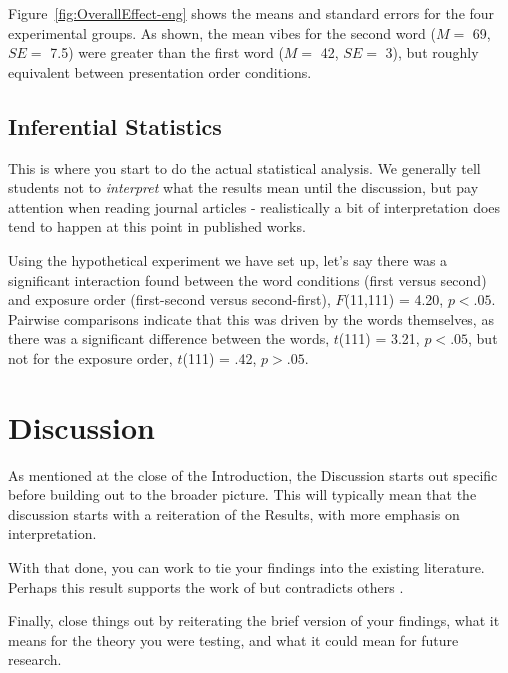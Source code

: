 \documentclass[stu,12pt,floatsintext,a4paper]{apa7}
\begin{document}
Figure~\ref{fig:OverallEffect-eng} shows the means and standard errors for the four experimental groups. As shown, the mean vibes for the second word ($M = $ 69, $SE = $ 7.5) were greater than the first word ($M = $ 42, $SE = $ 3), but roughly equivalent between presentation order conditions.

\subsection{Inferential Statistics}

This is where you start to do the actual statistical analysis. We generally tell students not to \textit{interpret} what the results mean until the discussion, but pay attention when reading journal articles - realistically a bit of interpretation does tend to happen at this point in published works.

\newcommand{\ttestSig}[2]{$t$(#1) = #2, $p < .05$}
\newcommand{\ttestInsig}[2]{$t$(#1) = #2, $p > .05$}
\newcommand{\anovaSig}[3]{$F$(#1,#2) = #3, $p < .05$}
\newcommand{\anovaInsig}[3]{$F$(#1,#2) = #3, $p > .05$}

Using the hypothetical experiment we have set up, let's say there was a significant interaction found between the word conditions (first versus second) and exposure order (first-second versus second-first), \anovaSig{11}{111}{4.20}. Pairwise comparisons indicate that this was driven by the words themselves, as there was a significant difference between the words, \ttestSig{111}{3.21}, but not for the exposure order, \ttestInsig{111}{.42}.

\section{Discussion}

As mentioned at the close of the Introduction, the Discussion starts out specific before building out to the broader picture. This will typically mean that the discussion starts with a reiteration of the Results, with more emphasis on interpretation.

With that done, you can work to tie your findings into the existing literature. Perhaps this result supports the work of \textcite{Contributor2023} but contradicts others \parencite[e.g.,][]{Sample2024}.

Finally, close things out by reiterating the brief version of your findings, what it means for the theory you were testing, and what it could mean for future research.

\printbibliography
\end{document}
